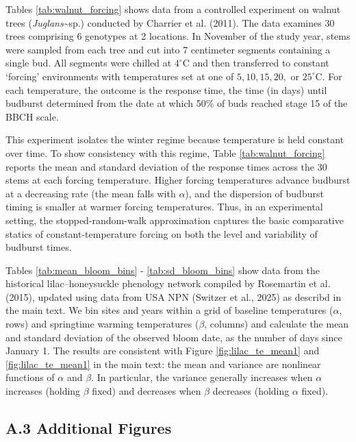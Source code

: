 \documentclass[
]{article}
\begin{document}
Tables \ref{tab:walnut_forcing} shows data from a controlled experiment on walnut trees
(\textit{Juglans}\textasciitilde sp.) conducted by Charrier et al.
(2011). The data examines 30 trees comprising 6 genotypes at 2
locations. In November of the study year, stems were sampled from each
tree and cut into 7 centimeter segments containing a single bud. All
segments were chilled at \(4^\circ\)C and then transferred to constant
`forcing' environments with temperatures set at one of \(5,10,15,20,\)
or \(25^\circ\)C. For each temperature, the outcome is the response
time, the time (in days) until budburst determined from the date at
which 50\% of buds reached stage 15 of the BBCH scale.

This experiment isolates the winter regime because temperature is held
constant over time. To show consistency with this regime, Table 
\ref{tab:walnut_forcing} reports the mean and standard deviation
of the response times across the 30 stems at each forcing temperature.
Higher forcing temperatures advance budburst at a decreasing rate 
(the mean falls with \(\alpha\)), and the dispersion of budburst timing is 
smaller at warmer forcing temperatures. Thus, in an experimental setting, the 
stopped-random-walk approximation captures the basic comparative statics of
constant-temperature forcing on both the level and variability of
budburst times. %

Tables \ref{tab:mean_bloom_bins} - \ref{tab:sd_bloom_bins} show data from
the historical lilac--honeysuckle phenology network compiled by Rosemartin et al. (2015), updated 
using data from USA NPN (Switzer et al., 2025) as describd in the main text. We bin sites and years 
within a grid  of baseline temperatures (\(\alpha\), rows) and springtime warming temperatures (\(\beta\), columns) 
and calculate the mean and standard deviation of the observed bloom date, as the number of days since January 1. 
The results are consistent with Figure \ref{fig:lilac_te_mean1} and \ref{fig:lilac_te_mean1} in the main text:
the mean and variance are nonlinear functions of $\alpha$ and $\beta$. In particular, the variance generally increases when
$\alpha$ increases (holding $\beta$ fixed) and decreases when $\beta$ decreases (holding $\alpha$ fixed). 


\subsection{A.3 Additional Figures}\label{a.3-additional-figures}
\end{document}
